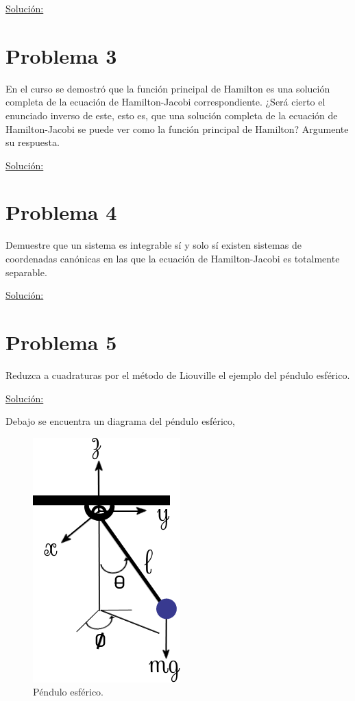 \documentclass[a4paper,10pt]{article}
\numberwithin{equation}{section}
\begin{document}
\underline{Solución:} \vspace{.3cm}

\section{Problema 3}

En el curso se demostró que la función principal de Hamilton es una solución completa 
de la ecuación de Hamilton-Jacobi correspondiente. ¿Será cierto el enunciado inverso 
de este, esto es, que una solución completa de la ecuación de Hamilton-Jacobi se puede 
ver como la función principal de Hamilton? Argumente su respuesta.

\vspace{.3cm}

\underline{Solución:} \vspace{.3cm}

\section{Problema 4}

Demuestre que un sistema es integrable sí y solo sí existen sistemas de coordenadas 
canónicas en las que la ecuación de Hamilton-Jacobi es totalmente separable.

\vspace{.3cm}

\underline{Solución:} \vspace{.3cm}

\section{Problema 5}

Reduzca a cuadraturas por el método de Liouville el ejemplo del péndulo esférico.

\vspace{.3cm}

\underline{Solución:} \vspace{.3cm}

Debajo se encuentra un diagrama del péndulo esférico,

\begin{figure}[H]
 \center 
 \includegraphics[scale=0.6]{problema5fig1}
 \caption{Péndulo esférico.}
 \label{fig:problema5fig1}
\end{figure}
\end{document}
